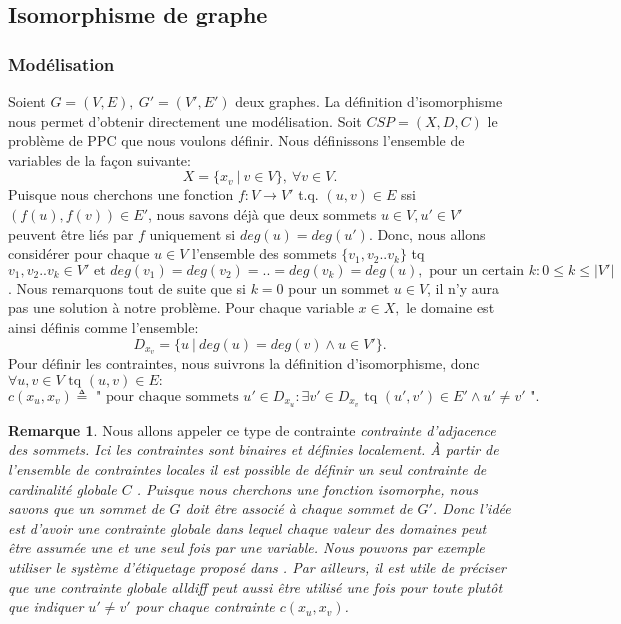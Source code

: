 \documentclass[french]{article}
\theoremstyle{definition}
\newtheorem{rem}{Remarque}[section]
\theoremstyle{remark}
\begin{document}
\subsection{Isomorphisme de graphe}
\subsubsection{Modélisation}
\label{sssec:model1}
Soient $G=(V, E),\ G'=(V', E')$ deux graphes. 
La définition d'isomorphisme nous permet d'obtenir directement une modélisation. Soit $CSP = (X, D, C)$ le problème de PPC que nous voulons définir. Nous définissons l'ensemble de variables de la façon suivante: 
$$X=\{x_v\ |\ v \in V \},\ \forall v \in V.$$
Puisque nous cherchons une fonction  $f: V \rightarrow V'$ t.q. $ (u,v) \in E$ ssi $ (f(u), f(v)) \in E'$, nous savons déjà que deux sommets $u \in V, u' \in V'$ peuvent être liés par $f$ uniquement si $deg(u) = deg(u')$. Donc, nous allons considérer pour chaque $u \in V$ l'ensemble des sommets $\{v_1, v_2..v_k\}$ tq $v_1, v_2..v_k \in V' \text{ et } deg(v_1)=deg(v_2)=..=deg(v_k)=deg(u), \text{ pour un certain } k: 0 \leq k \leq |V'|$. Nous remarquons tout de suite que si $k=0$ pour un sommet $u \in V$, il n'y aura pas une solution à notre problème. Pour chaque variable $x \in X,$ le domaine est ainsi définis comme l'ensemble: 
$$D_{x_v}=\{u\ |\ deg(u) = deg(v) \land u \in V'\}.$$
Pour définir les contraintes, nous suivrons la définition d'isomorphisme, donc $\forall u, v \in V \text{ tq } (u,v) \in E:$
$$c(x_u, x_v) \triangleq \text{ " pour chaque sommets } u' \in D_{x_u}: \exists v' \in D_{x_v} \text{ tq } (u', v') \in E' \land u' \neq v' \text{ "}.$$
\begin{rem}
	\label{rem:contraintes}
	Nous allons appeler ce type de contrainte \it contrainte d'adjacence des sommets\rm. Ici les contraintes sont binaires et définies localement. À partir de l'ensemble de contraintes locales il est possible de définir un seul contrainte de cardinalité globale $C$ \cite{regin}. Puisque nous cherchons une fonction isomorphe, nous savons que un sommet de $G$ doit être associé à chaque sommet de $G'$. Donc l'idée est d'avoir une contrainte globale dans lequel chaque valeur des domaines peut être assumée une et une seul fois par une variable. Nous pouvons par exemple utiliser le système d'étiquetage proposé dans \cite{contrainteglobale}.
	Par ailleurs, il est utile de préciser que une contrainte globale \it alldiff \rm peut aussi être utilisé une fois pour toute plutôt que indiquer $u' \neq v'$ pour chaque contrainte $c(x_u, x_v)$.
\end{rem}
\end{document}

